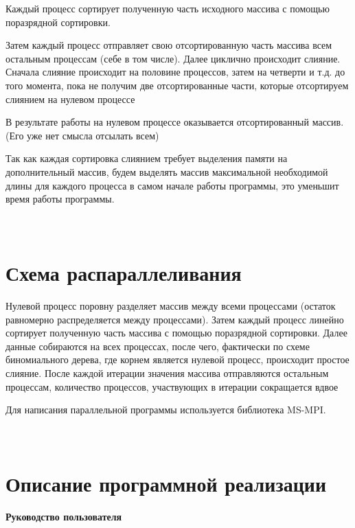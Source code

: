\documentclass[]{article}
\begin{document}
Каждый процесс сортирует полученную часть исходного массива с помощью
поразрядной сортировки.

Затем каждый процесс отправляет свою отсортированную часть массива всем
остальным процессам (себе в том числе). Далее циклично происходит
слияние. Сначала слияние происходит на половине процессов, затем на
четверти и т.д. до того момента, пока не получим две отсортированные
части, которые отсортируем слиянием на нулевом процессе

В результате работы на нулевом процессе оказывается отсортированный
массив. (Его уже нет смысла отсылать всем)

Так как каждая сортировка слиянием требует выделения памяти на
дополнительный массив, будем выделять массив максимальной необходимой
длины для каждого процесса в самом начале работы программы, это уменьшит
время работы программы.

\section{\texorpdfstring{\\
Схема
распараллеливания}{ Схема распараллеливания}}\label{ux441ux445ux435ux43cux430-ux440ux430ux441ux43fux430ux440ux430ux43bux43bux435ux43bux438ux432ux430ux43dux438ux44f}

Нулевой процесс поровну разделяет массив между всеми процессами (остаток
равномерно распределяется между процессами). Затем каждый процесс
линейно сортирует полученную часть массива с помощью поразрядной
сортировки. Далее данные собираются на всех процессах, после чего,
фактически по схеме биномиального дерева, где корнем является нулевой
процесс, происходит простое слияние. После каждой итерации значения
массива отправляются остальным процессам, количество процессов,
участвующих в итерации сокращается вдвое

Для написания параллельной программы используется библиотека MS-MPI.

\section{\texorpdfstring{\\
Описание программной
реализации}{ Описание программной реализации}}\label{ux43eux43fux438ux441ux430ux43dux438ux435-ux43fux440ux43eux433ux440ux430ux43cux43cux43dux43eux439-ux440ux435ux430ux43bux438ux437ux430ux446ux438ux438}

\textbf{Руководство пользователя}
\end{document}
